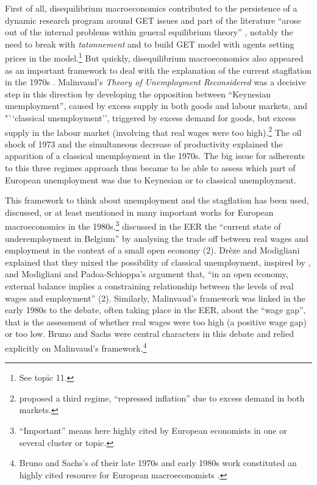 \documentclass[]{elsarticle} %
\begin{document}
First of all, disequilibrium macroeconomics contributed to the
persistence of a dynamic research program around GET issues and part of
the literature ``arose out of the internal problems within general
equilibrium theory'' \citep[105]{backhouseboianovski2013}, notably the
need to break with \emph{tatonnement} and to build GET model with agents
setting prices in the model.\footnote{See topic 11.} But quickly,
disequilibrium macroeconomics also appeared as an important framework to
deal with the explanation of the current stagflation in the 1970s
\citep[chapter 8]{backhouseboianovski2013}. Malinvaud's \emph{Theory of
Unemployment Reconsidered} \citeyearpar{malinvaud1977} was a decisive
step in this direction by developing the opposition between ``Keynesian
unemployment'', caused by excess supply in both goods and labour
markets, and "``classical unemployment'', triggered by excess demand for
goods, but excess supply in the labour market (involving that real wages
were too high).\footnote{\citet{malinvaud1977} proposed a third regime,
  ``repressed inflation'' due to excess demand in both markets.} The oil
shock of 1973 and the simultaneous decrease of productivity explained
the apparition of a classical unemployment in the 1970s. The big issue
for adherents to this three regimes approach thus became to be able to
assess which part of European unemployment was due to Keynesian or to
classical unemployment.

This framework to think about unemployment and the stagflation has been
used, discussed, or at least mentioned in many important works for
European macroeconomics in the 1980s.\footnote{``Important'' means here
  highly cited by European economists in one or several cluster or
  topic.} \citet{dreze1981} discussed in the EER the ``current state of
underemployment in Belgium'' by analysing the trade off between real
wages and employment in the context of a small open economy (2). Drèze
and Modigliani explained that they mixed the possibility of classical
unemployment, inspired by \citet{malinvaud1977}, and Modigliani and
Padoa-Schioppa's argument that, ``in an open economy, external balance
implies a constraining relationship between the levels of real wages and
employment'' (2). Similarly, Malinvaud's framework was linked in the
early 1980s to the debate, often taking place in the EER, about the
``wage gap'', that is the assessment of whether real wages were too high
(a positive wage gap) or too low. Bruno and Sachs were central
characters in this debate and relied explicitly on Malinvaud's
framework.\footnote{Bruno and Sachs's \citeyearpar{brunosachs1985} of
  their late 1970s and early 1980s work constituted an highly cited
  resource for European macroeconomists \citep[see also][section
  3]{goutsmedt2021}.}
\end{document}
